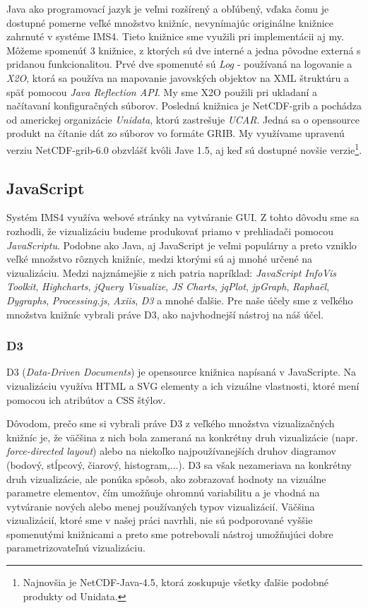 Java ako programovací jazyk je veľmi rozšírený a obľúbený, vďaka čomu je dostupné pomerne veľké množstvo knižníc, nevynímajúc originálne knižnice zahrnuté v systéme IMS4. Tieto knižnice sme využili pri implementácii aj my. Môžeme spomenúť 3 knižnice, z ktorých sú dve interné a jedna pôvodne externá s pridanou funkcionalitou. Prvé dve spomenuté sú \textit{Log} - používaná na logovanie a \textit{X2O}, ktorá sa používa na mapovanie javovských objektov na XML štruktúru a späť pomocou \textit{Java Reflection API}. My sme X2O použili pri ukladaní a načítavaní konfiguračných súborov. Posledná knižnica je NetCDF-grib \cite{Unidata} a pochádza od americkej organizácie \textit{Unidata}, ktorú zastrešuje \textit{UCAR}. Jedná sa o opensource produkt na čítanie dát zo súborov vo formáte GRIB. My využívame upravenú verziu NetCDF-grib-6.0 obzvlášť kvôli Jave 1.5, aj keď sú dostupné novšie verzie\footnote{Najnovšia je NetCDF-Java-4.5, ktorá zoskupuje všetky ďalšie podobné produkty od Unidata.}.

\subsection{JavaScript}
Systém IMS4 využíva webové stránky na vytváranie GUI. Z tohto dôvodu sme sa rozhodli, že vizualizáciu budeme produkovať priamo v prehliadači pomocou \textit{JavaScriptu}. Podobne ako Java, aj JavaScript je veľmi populárny a preto vzniklo veľké množstvo rôznych knižníc, medzi ktorými sú aj mnohé určené na vizualizáciu. Medzi najznámejšie z nich patria napríklad: \textit{JavaScript InfoVis Toolkit}, \textit{Highcharts}, \textit{jQuery Visualize}, \textit{JS Charts}, \textit{jqPlot}, \textit{jpGraph}, \textit{Raphaël}, \textit{Dygraphs},\textit{ Processing.js}, \textit{Axiis}, \textit{D3} a mnohé ďalšie. Pre naše účely sme z veľkého množstva knižníc vybrali práve D3, ako najvhodnejší nástroj na náš účel.

\subsubsection{D3}
D3 (\textit{Data-Driven Documents}) \cite{D3} je opensource knižnica napísaná v JavaScripte. Na vizualizáciu využíva HTML a SVG elementy a ich vizuálne vlastnosti, ktoré mení pomocou ich atribútov a CSS štýlov. 

Dôvodom, prečo sme si vybrali práve D3 z veľkého množstva vizualizačných knižníc je, že väčšina z nich bola zameraná na konkrétny druh vizualizácie (napr. \textit{force-directed layout}) alebo na niekoľko najpoužívanejších druhov diagramov (bodový, stĺpcový, čiarový, histogram,...). D3 sa však nezameriava na konkrétny druh vizualizácie, ale ponúka spôsob, ako zobrazovať hodnoty na vizuálne parametre elementov, čím umožňuje ohromnú variabilitu a je vhodná na vytváranie nových alebo menej používaných typov vizualizácií. Väčšina vizualizácií, ktoré sme v našej práci navrhli, nie sú podporované vyššie spomenutými knižnicami a preto sme potrebovali nástroj umožňujúci dobre parametrizovateľnú vizualizáciu.

